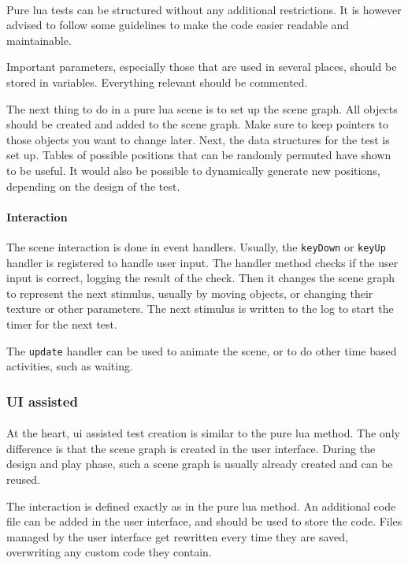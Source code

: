 \paragraph{}
Pure lua tests can be structured without any additional restrictions.
It is however advised to follow some guidelines to make the code easier readable
and maintainable.

Important parameters, especially those that are used in several places, should be stored in variables.
Everything relevant should be commented.

The next thing to do in a pure lua scene is to set up the scene graph.
All objects should be created and added to the scene graph.
Make sure to keep pointers to those objects you want to change later.
Next, the data structures for the test is set up.
Tables of possible positions that can be randomly permuted have shown to be useful.
It would also be possible to dynamically generate new positions, depending on the design of the test.

\paragraph{Interaction}
The scene interaction is done in event handlers.
Usually, the \texttt{keyDown} or \texttt{keyUp} handler is registered to handle user input.
The handler method checks if the user input is correct, logging the result of the check.
Then it changes the scene graph to represent the next stimulus, usually by moving objects, or changing their texture or other parameters.
The next stimulus is written to the log to start the timer for the next test.

The \texttt{update} handler can be used to animate the scene,
or to do other time based activities, such as waiting.


\subsubsection{UI assisted}
\paragraph{}
At the heart, ui assisted test creation is similar to the pure lua method.
The only difference is that the scene graph is created in the user interface.
During the design and play phase, such a scene graph is usually already created and can be reused.

The interaction is defined exactly as in the pure lua method.
An additional code file can be added in the user interface, and should be used to store the code.
Files managed by the user interface get rewritten every time they are saved, overwriting any custom code they contain.


